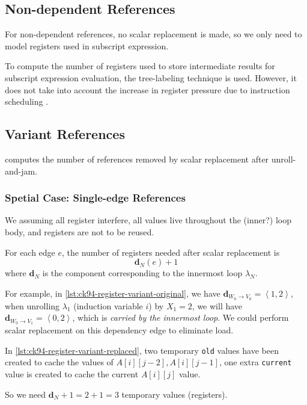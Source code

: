 \subsection{Non-dependent References}
For non-dependent references, no scalar replacement is made, so we only need to
model registers used in subscript expression.

To compute the number of registers used to store intermediate results for
subscript expression evaluation, the tree-labeling technique
\cite{sethiUllman1970} is used. However, it does not take into account the
increase in register pressure due to instruction scheduling
\cite{carrKennedy1994}.

\subsection{Variant References}
 computes the number of
references removed by scalar replacement after unroll-and-jam.

\subsubsection{Spetial Case: Single-edge References}
We assuming all register interfere, all values live throughout the (inner?) loop body, and registers are not 
to be reused.

For each edge $e$, the number of registers
needed after scalar replacement is
\begin{equation}
\mathbf{d}_{N}(e) + 1
\end{equation}
where $\mathbf{d}_{N}$ is the component corresponding to the innermost loop
$\lambda_{N}$.


For example, in \cref{lst:ck94-register-variant-original}, we have
$\mathbf{d}_{W_0\rightarrow V_0} = \left\langle 1, 2\right\rangle$, when
unrolling $\lambda_1$ (induction variable $i$) by $X_1 = 2$, we will have $\mathbf{d}_{W_0\rightarrow
V_1} = \left\langle 0, 2 \right\rangle$, which is \textit{carried by the
innermost loop}.
We could perform scalar replacement on this dependency edge to eliminate load.

In \cref{lst:ck94-register-variant-replaced}, two temporary \texttt{old} values
have been created to cache the values of $A[i][j-2], A[i][j-1]$, one extra
\texttt{current} value is created to cache the current $A[i][j]$ value.

So we need $\mathbf{d}_{N} + 1 = 2 + 1 = 3$ temporary values (registers).

